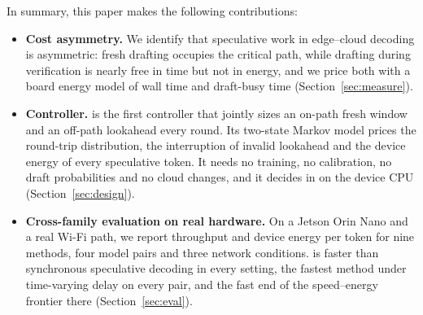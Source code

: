 In summary, this paper makes the following contributions:
\begin{itemize}
\item \textbf{Cost asymmetry.} We identify that speculative work in edge--cloud decoding is asymmetric: fresh drafting occupies the critical path, while drafting during verification is nearly free in time but not in energy, and we price both with a board energy model of wall time and draft-busy time (Section~\ref{sec:measure}).
\item \textbf{Controller.} \cape{} is the first controller that jointly sizes an on-path fresh window and an off-path lookahead every round. Its two-state Markov model prices the round-trip distribution, the interruption of invalid lookahead and the device energy of every speculative token. It needs no training, no calibration, no draft probabilities and no cloud changes, and it decides in  on the device CPU (Section~\ref{sec:design}).
\item \textbf{Cross-family evaluation on real hardware.} On a Jetson Orin Nano and a real Wi-Fi path, we report throughput and device energy per token for nine methods, four model pairs and three network conditions. \cape{} is faster than synchronous speculative decoding in every setting, the fastest method under time-varying delay on every pair, and the fast end of the speed--energy frontier there (Section~\ref{sec:eval}).
\end{itemize}
